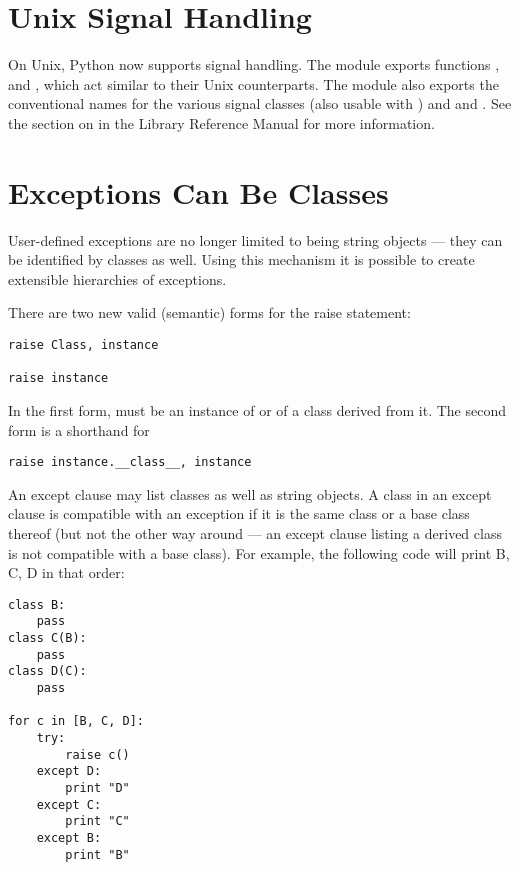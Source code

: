 \section{Unix Signal Handling}

On Unix, Python now supports signal handling.  The module
 exports functions ,  and
, which act similar to their Unix counterparts.  The
module also exports the conventional names for the various signal
classes (also usable with ) and  and
.  See the section on  in the Library
Reference Manual for more information.

\section{Exceptions Can Be Classes}

User-defined exceptions are no longer limited to being string objects
--- they can be identified by classes as well.  Using this mechanism it
is possible to create extensible hierarchies of exceptions.

There are two new valid (semantic) forms for the raise statement:

\begin{verbatim}
raise Class, instance

raise instance
\end{verbatim}

In the first form,  must be an instance of 
or of a class derived from it.  The second form is a shorthand for

\begin{verbatim}
raise instance.__class__, instance
\end{verbatim}

An except clause may list classes as well as string objects.  A class
in an except clause is compatible with an exception if it is the same
class or a base class thereof (but not the other way around --- an
except clause listing a derived class is not compatible with a base
class).  For example, the following code will print B, C, D in that
order:

\begin{verbatim}
class B:
    pass
class C(B):
    pass
class D(C):
    pass

for c in [B, C, D]:
    try:
        raise c()
    except D:
        print "D"
    except C:
        print "C"
    except B:
        print "B"
\end{verbatim}

